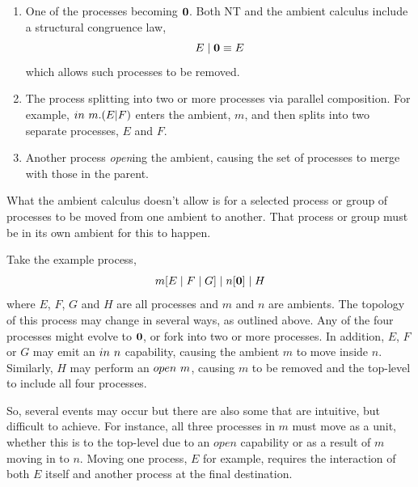 \begin{enumerate}
\item One of the processes becoming $\textbf{0}$.  Both NT and the ambient
      calculus include a structural congruence law,
\begin{equation}
E\;|\;\textbf{0} \equiv E
\end{equation}
      which allows such processes to be removed.
\item The process splitting into two or more processes via parallel
      composition.  For example, $in\ m.(E | F)$ enters the ambient, $m$,
      and then splits into two separate processes, $E$ and $F$.
\item Another process \emph{open}ing the ambient, causing the set of
      processes to merge with those in the parent.
\end{enumerate}

What the ambient calculus doesn't allow is for a selected process or
group of processes to be moved from one ambient to another.  That
process or group must be in its own ambient for this to happen.

Take the example process, 
\begin{equation}
m[E\;|\;F\;|\;G]\;|\;n[\textbf{0}]\;|\;H
\end{equation}
where $E$, $F$, $G$ and $H$ are all processes and $m$ and $n$
are ambients.  The topology of this process may change in several ways, as
outlined above. Any of the four processes might evolve to $\textbf{0}$, or fork
into two or more processes.  In addition, $E$, $F$ or $G$ may emit an
$in\ n$ capability, causing the ambient $m$ to move inside $n$.
Similarly, $H$ may perform an $open\ m$, causing $m$ to be removed and
the top-level to include all four processes.

So, several events may occur but there are also some that are intuitive,
but difficult to achieve.  For instance, all three processes in $m$ must
move as a unit, whether this is to the top-level due to an $open$
capability or as a result of $m$ moving in to $n$.  Moving one process,
$E$ for example, requires the interaction of both $E$ itself and another
process at the final destination.


